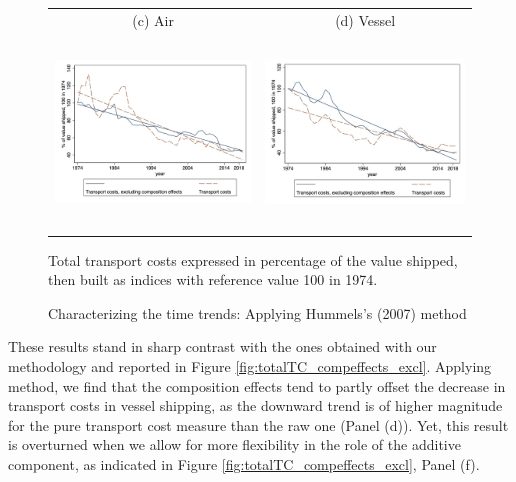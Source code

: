 \documentclass[a4paper,11pt]{article}
\begin{document}
\begin{figure}[htbp]
\caption{Characterizing the time trends: Applying Hummels's (2007) method }
\label{fig:comp_effects_as_in_Hummels}
\begin{center}
\begin{tabular}{cc}
{\small (c) Air } & {\small (d) Vessel}\\
\includegraphics[width=2.5in, height=2in]{figure5_comme_hummels_base100.jpg}
& \includegraphics[width=2.5in,height=2in]{figure6_comme_hummels_base100.jpg} \\
\end{tabular}
	\begin{minipage}  [c]  {5in}
		\footnotesize
Total transport costs expressed in percentage of the value shipped, then built as indices with reference value 100 in 1974.
\end{minipage}
\end{center}
\end{figure}

These results stand in sharp contrast with the ones obtained with our methodology and reported in Figure \ref{fig:totalTC_compeffects_excl}.
Applying \cite{hummels2007} method, we find that the composition effects tend to partly offset the decrease in transport costs in vessel shipping, as the downward trend is of higher magnitude for the pure transport cost measure than the raw one (Panel (d)). Yet, this result is overturned when we allow for more flexibility in the role of the additive component, as indicated in Figure \ref{fig:totalTC_compeffects_excl}, Panel (f).\medskip
\end{document}
